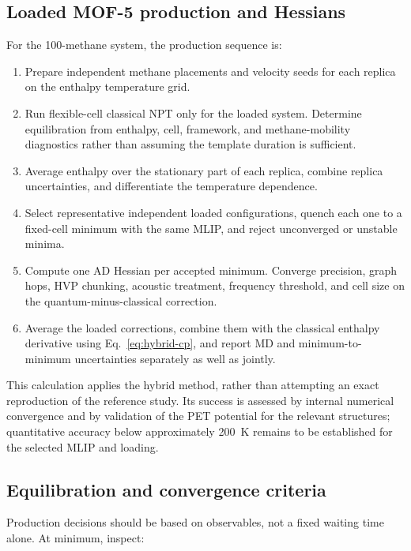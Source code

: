 \documentclass[10pt,a4paper,twocolumn]{article}
\begin{document}
\subsection{Loaded MOF-5 production and Hessians}

For the 100-methane system, the production sequence is:

\begin{enumerate}
  \item Prepare independent methane placements and velocity seeds for each
        replica on the enthalpy temperature grid.
  \item Run flexible-cell classical NPT only for the loaded system. Determine
        equilibration from enthalpy, cell, framework, and methane-mobility
        diagnostics rather than assuming the template duration is sufficient.
  \item Average enthalpy over the stationary part of each replica, combine
        replica uncertainties, and differentiate the temperature dependence.
  \item Select representative independent loaded configurations, quench each
        one to a fixed-cell minimum with the same MLIP, and reject unconverged
        or unstable minima.
  \item Compute one AD Hessian per accepted minimum. Converge precision, graph
        hops, HVP chunking, acoustic treatment, frequency threshold, and cell
        size on the quantum-minus-classical correction.
  \item Average the loaded corrections, combine them with the classical
        enthalpy derivative using Eq.~\eqref{eq:hybrid-cp}, and report MD and
        minimum-to-minimum uncertainties separately as well as jointly.
\end{enumerate}

This calculation applies the hybrid method, rather than attempting an exact
reproduction of the reference study. Its success is assessed by internal
numerical convergence and by validation of the PET potential for the relevant
structures; quantitative accuracy below approximately \SI{200}{K} remains to
be established for the selected MLIP and loading.

\subsection{Equilibration and convergence criteria}

Production decisions should be based on observables, not a fixed waiting time
alone. At minimum, inspect:
\end{document}
